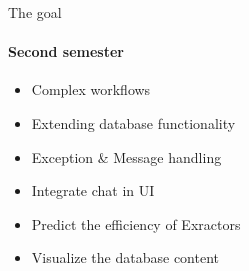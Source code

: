 \begin{frame}{The goal}
\framesubtitle{Second semester}
	\begin{itemize}
		\item Complex workflows
		\item Extending database functionality
		\item Exception \& Message handling
		\item Integrate chat in UI
		\item Predict the efficiency of Exractors
		\item Visualize the database content
	\end{itemize}
\end{frame}
